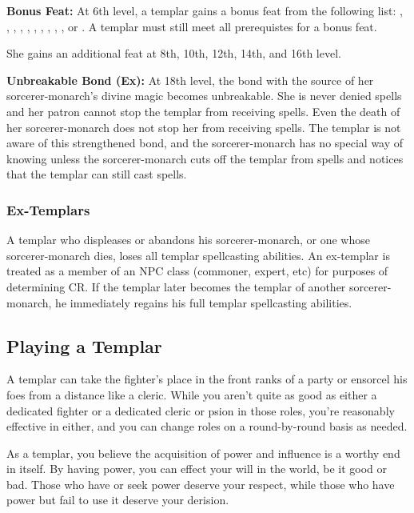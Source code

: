 \textbf{Bonus Feat:} At 6th level, a templar gains a bonus feat from the following list:
,
,
,
,
,
,
,
,
,
,
or .
A templar must still meet all prerequistes for a bonus feat.

She gains an additional feat at 8th, 10th, 12th, 14th, and 16th level.


\textbf{Unbreakable Bond (Ex):} At 18th level, the bond with the source of her sorcerer-monarch's divine magic becomes unbreakable. She is never denied spells and her patron cannot stop the templar from receiving spells. Even the death of her sorcerer-monarch does not stop her from receiving spells. The templar is not aware of this strengthened bond, and the sorcerer-monarch has no special way of knowing unless the sorcerer-monarch cuts off the templar from spells and notices that the templar can still cast spells.



\subsubsection{Ex-Templars}
A templar who displeases or abandons his sorcerer-monarch, or one whose sorcerer-monarch dies, loses all templar spellcasting abilities. An ex-templar is treated as a member of an NPC class (commoner, expert, etc) for purposes of determining CR. If the templar later becomes the templar of another sorcerer-monarch, he immediately regains his full templar spellcasting abilities.



\subsection{Playing a Templar}
A templar can take the fighter's place in the front ranks of a party or ensorcel his foes from a distance like a cleric. While you aren't quite as good as either a dedicated fighter or a dedicated cleric or psion in those roles, you're reasonably effective in either, and you can change roles on a round-by-round basis as needed.

As a templar, you believe the acquisition of power and influence is a worthy end in itself. By having power, you can effect your will in the world, be it good or bad. Those who have or seek power deserve your respect, while those who have power but fail to use it deserve your derision.


